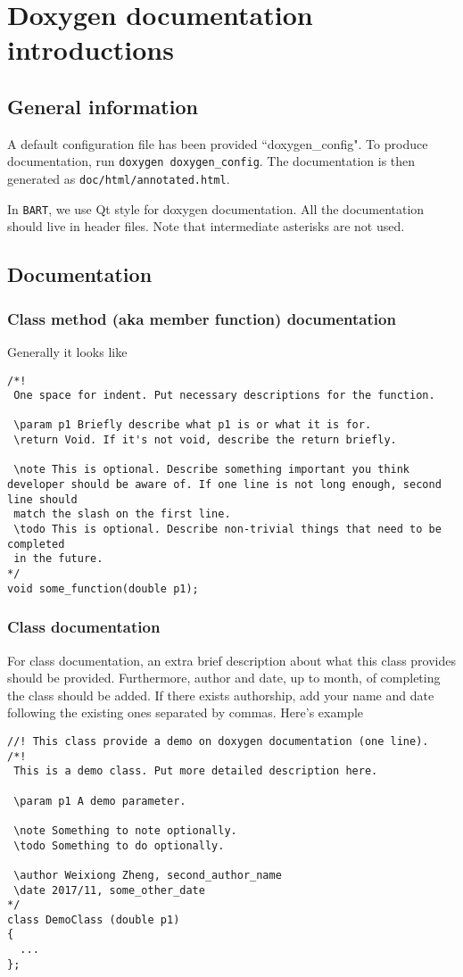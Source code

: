 \documentclass[openany]{book}
\newcommand{\bart}{{\tt BART}}
\begin{document}
\chapter{Doxygen documentation introductions}\label{ch:doxygen}
\section{General information}
A default configuration file has been provided ``doxygen\_config". To produce documentation, run {\tt doxygen doxygen\_config}. The documentation is then generated as {\tt doc/html/annotated.html}.

In \bart, we use Qt style for doxygen documentation. All the documentation should live in header files. Note that intermediate asterisks are not used.
\section{Documentation}
\subsection{Class method (aka member function) documentation}
Generally it looks like
\begin{lstlisting}
/*!
 One space for indent. Put necessary descriptions for the function.
 
 \param p1 Briefly describe what p1 is or what it is for.
 \return Void. If it's not void, describe the return briefly.
 
 \note This is optional. Describe something important you think developer should be aware of. If one line is not long enough, second line should
 match the slash on the first line.
 \todo This is optional. Describe non-trivial things that need to be completed 
 in the future.
*/
void some_function(double p1);
\end{lstlisting}

\subsection{Class documentation}
For class documentation, an extra brief description about what this class provides should be provided. Furthermore, author and date, up to month, of completing the class should be added. If there exists authorship, add your name and date following the existing ones separated by commas. Here's example
\begin{lstlisting}
//! This class provide a demo on doxygen documentation (one line).
/*!
 This is a demo class. Put more detailed description here.
 
 \param p1 A demo parameter.
 
 \note Something to note optionally.
 \todo Something to do optionally.
 
 \author Weixiong Zheng, second_author_name
 \date 2017/11, some_other_date
*/
class DemoClass (double p1)
{
  ...
};
\end{lstlisting}
\end{document}
